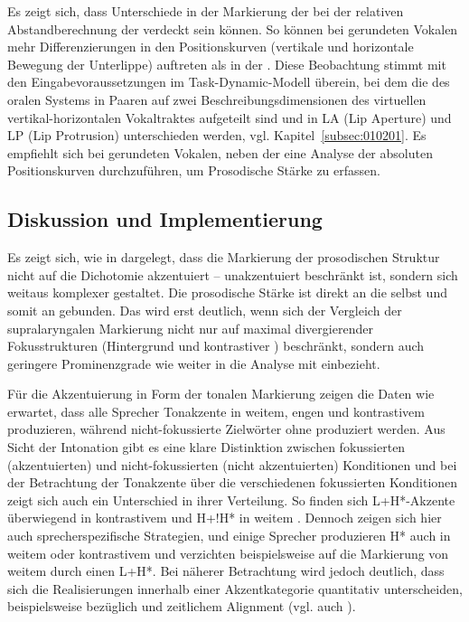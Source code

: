 Es zeigt sich, dass Unterschiede in der Markierung der  bei der relativen Abstandberechnung der  verdeckt sein können. So können bei gerundeten Vokalen mehr Differenzierungen in den Positionskurven (vertikale und horizontale Bewegung der Unterlippe) auftreten als in der . Diese Beobachtung stimmt mit den Eingabevoraussetzungen im Task-Dynamic-Modell überein, bei dem die  des oralen Systems in Paaren auf zwei Beschreibungsdimensionen des virtuellen vertikal-horizontalen Vokaltraktes aufgeteilt sind und in LA (Lip Aperture) und LP (Lip Protrusion) unterschieden werden, vgl. Kapitel~\ref{subsec:010201}. Es empfiehlt sich bei gerundeten Vokalen, neben der  eine Analyse der absoluten Positionskurven durchzuführen, um Prosodische Stärke zu erfassen.

\subsection{Diskussion und Implementierung}
\label{subsec:060306}

Es zeigt sich, wie in \citet{Mücke2014b} dargelegt, dass die Markierung der prosodischen Struktur nicht auf die Dichotomie akzentuiert -- unakzentuiert beschränkt ist, sondern sich weitaus komplexer gestaltet. Die prosodische Stärke ist direkt an die  selbst und somit an  gebunden. Das wird erst deutlich, wenn sich der Vergleich der supralaryngalen Markierung nicht nur auf maximal divergierender Fokusstrukturen (Hintergrund und kontrastiver ) beschränkt, sondern auch geringere Prominenzgrade wie weiter  in die Analyse mit einbezieht.

Für die Akzentuierung in Form der tonalen Markierung zeigen die Daten wie erwartet, dass alle Sprecher Tonakzente in weitem, engen und kontrastivem  produzieren, während nicht-fokussierte Zielwörter ohne  produziert werden. Aus Sicht der Intonation gibt es eine klare Distinktion zwischen fokussierten (akzentuierten) und nicht-fokussierten (nicht akzentuierten) Konditionen und bei der Betrachtung der Tonakzente über die verschiedenen fokussierten Konditionen zeigt sich auch ein Unterschied in ihrer Verteilung. So finden sich L+H*-Akzente überwiegend in kontrastivem  und H+!H* in weitem . Dennoch zeigen sich hier auch sprecherspezifische Strategien, und einige Sprecher produzieren H* auch in weitem oder kontrastivem  und verzichten beispielsweise auf die Markierung von weitem  durch einen L+H*. Bei näherer Betrachtung wird jedoch deutlich, dass sich die Realisierungen innerhalb einer Akzentkategorie quantitativ unterscheiden, beispielsweise bezüglich  und zeitlichem Alignment (vgl. auch \citealt{Grice2017}).

